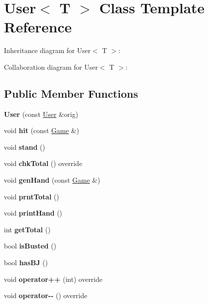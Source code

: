 \hypertarget{class_user}{}\section{User$<$ T $>$ Class Template Reference}
\label{class_user}


Inheritance diagram for User$<$ T $>$\+:


Collaboration diagram for User$<$ T $>$\+:
\subsection*{Public Member Functions}
\begin{DoxyCompactItemize}
\item 
\mbox{\label{class_user_ae52b993308c967e4f110315c28d9cf53}} 
{\bfseries User} (const \mbox{\hyperlink{class_user}{User}} \&orig)
\item 
\mbox{\label{class_user_a87d8e32ffda8ac7765059d7a90cc4f0f}} 
void {\bfseries hit} (const \mbox{\hyperlink{class_game}{Game}} \&)
\item 
\mbox{\label{class_user_aa997615ff3139f7e2f6c2c017114b8b8}} 
void {\bfseries stand} ()
\item 
\mbox{\label{class_user_a904f0117e1cd9a9d03cc640c7a2e35f9}} 
void {\bfseries chk\+Total} () override
\item 
\mbox{\label{class_user_a7c159532869bdaa8011bff19b8447e1e}} 
void {\bfseries gen\+Hand} (const \mbox{\hyperlink{class_game}{Game}} \&)
\item 
\mbox{\label{class_user_acc140b83373ab06efbd4e548cdbcd33b}} 
void {\bfseries prnt\+Total} ()
\item 
\mbox{\label{class_user_a26d40bccb38fbfa5cdbc3c6df765c2e9}} 
void {\bfseries print\+Hand} ()
\item 
\mbox{\label{class_user_ada32ea887c08cd56d00db1619fac48c2}} 
int {\bfseries get\+Total} ()
\item 
\mbox{\label{class_user_a06f2a67195919f3c0f791cc16d8e98ad}} 
bool {\bfseries is\+Busted} ()
\item 
\mbox{\label{class_user_aee0b224f38f6f4a556dd24c5486f140e}} 
bool {\bfseries has\+BJ} ()
\item 
\mbox{\label{class_user_a12cd255413c9b349c2d9274e8e5260b1}} 
void {\bfseries operator++} (int) override
\item 
\mbox{\label{class_user_a79b5a45060baa7b9d20c6e6f8a320b37}} 
void {\bfseries operator-\/-\/} () override
\end{DoxyCompactItemize}
